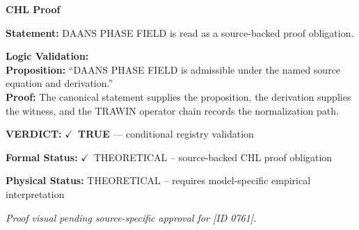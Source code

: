 \vspace{0.45em}
\noindent\textbf{CHL Proof}\par
\textbf{Statement:} DAANS PHASE FIELD is read as a source-backed proof obligation.

\textbf{Logic Validation:}\\
\textbf{Proposition:} ``DAANS PHASE FIELD is admissible under the named source equation and derivation.''\\
\textbf{Proof:} The canonical statement supplies the proposition, the derivation supplies the witness, and the TRAWIN operator chain records the normalization path.

\textbf{VERDICT:} \ensuremath{\checkmark}\ \textbf{TRUE} --- conditional registry validation

\textbf{Formal Status:} \ensuremath{\checkmark}\ THEORETICAL -- source-backed CHL proof obligation

\textbf{Physical Status:} THEORETICAL -- requires model-specific empirical interpretation
\par\vspace{0.45em}
\par
\vfill
\begingroup\footnotesize\itshape
Proof visual pending source-specific approval for [ID 0761].
\par\endgroup
\vfill
\endgroup
\endgroup
